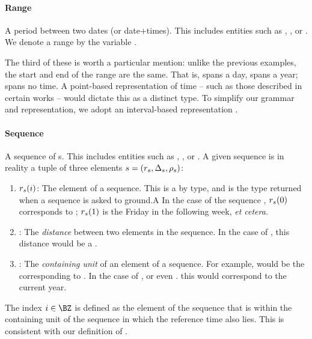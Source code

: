 \paragraph{Range}
A period between two dates (or date$+$times).
This includes entities such as , , or
	.
We denote a range by the variable \range.

The third of these is worth a particular mention:
	unlike the previous examples, the start and end of the range are the same.
That is,  spans a day,  spans a year; 
	spans no time.
A point-based representation of time -- such as those described in
	certain works \needcite -- would dictate this as a distinct type.
To simplify our grammar and representation, we adopt an interval-based
	representation \needcite.

\paragraph{Sequence}
A sequence of s.
This includes entities such as , , or
	.
A given sequence is in reality a tuple of three elements
	$s=(r_s,\Delta_s,\rho_s)$:
\begin{enumerate}
	\item $r_s(i)$: 
		The  element of a sequence.
		This is a  by type, and is the type returned when a sequence is
			asked to ground.A
		In the case of the sequence , $r_s(0)$ corresponds to
			; 
			$r_s(1)$ is the Friday in the following week, \textit{et cetera}.
	\item \seqjump:
		The \textit{distance} between two elements in the sequence.
		In the case of , this distance would be a .
	\item \seqcanon:
		The \textit{containing unit} of an element of a sequence.
		For example,  would be the 
			corresponding to .
		In the case of , or even . this 
			would correspond to the current year.
\end{enumerate}

The index $i \in \BZ$ is defined as the element of the sequence
	that is within the containing unit \seqcanon of the sequence in which the 
	reference time also lies.
This is consistent with our definition of \seqelem.

